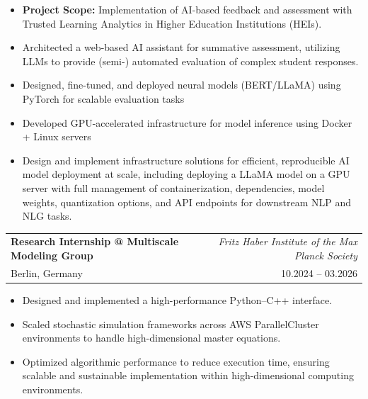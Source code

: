 \documentclass[A4,11pt]{article}
\makeatletter
\newcommand{\CVItem}[1]{
  \item\small{
    {#1 \vspace{-2pt}}
  }
}
\newcommand{\CVSubheading}[4]{
  \vspace{-2pt}\item
    \begin{tabular*}{0.97\textwidth}[t]{l@{\extracolsep{\fill}}r}
      \textbf{#1} & #2 \\
      \small#3 & \small #4 \\
    \end{tabular*}\vspace{-7pt}
}
\newcommand{\CVItemListStart}{\begin{itemize}}
\newcommand{\CVItemListEnd}{\end{itemize}\vspace{-5pt}}
\makeatother
\begin{document}
 

    \CVItemListStart
   \CVItem{\textbf{Project Scope:} Implementation of AI-based feedback and assessment with Trusted Learning Analytics in Higher Education Institutions (HEIs).}
   
     \CVItem{Architected a web-based AI assistant for summative assessment, utilizing LLMs to provide (semi-) automated evaluation of complex student responses.}
     
            \CVItem{Designed, fine-tuned, and deployed neural models (BERT/LLaMA) using PyTorch for scalable evaluation tasks}
        

           \CVItem{Developed GPU-accelerated infrastructure for model inference using Docker + Linux servers}

        \CVItem{Design and implement infrastructure solutions for efficient, reproducible AI model deployment at scale, including deploying a LLaMA model on a GPU server with full management of containerization, dependencies, model weights, quantization options, and API endpoints for downstream NLP and NLG tasks.}
    \CVItemListEnd





\CVSubheading
  {Research Internship @ Multiscale Modeling Group}
  {\textit{Fritz Haber Institute of the Max Planck Society}}
  {Berlin, Germany}
  {10.2024 -- 03.2026}


\CVItemListStart
    \CVItem{Designed and implemented a high-performance Python–C++ interface.}
    \CVItem{Scaled stochastic simulation frameworks across AWS ParallelCluster environments to handle high-dimensional master equations.}
    \CVItem{Optimized algorithmic performance to reduce execution time, ensuring scalable and sustainable implementation within high-dimensional computing environments.}
    
    
    
\CVItemListEnd
\end{document}
